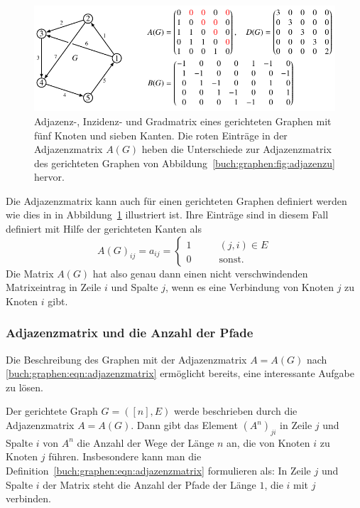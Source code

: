 \begin{figure}
\centering
\includegraphics{chapters/70-graphen/images/adjazenzd.pdf}
\caption{Adjazenz-, Inzidenz- und Gradmatrix eines gerichteten
Graphen mit fünf Knoten und sieben Kanten.
Die roten Einträge in der Adjazenzmatrix $A(G)$ heben die
Unterschiede zur Adjazenzmatrix des gerichteten Graphen
von Abbildung~\ref{buch:graphen:fig:adjazenzu} hervor.
\label{buch:graphen:fig:adjazenzd}}
\end{figure}
Die Adjazenzmatrix kann auch für einen gerichteten Graphen definiert
werden wie dies in in Abbildung~\ref{buch:graphen:fig:adjazenzd}
illustriert ist.
Ihre Einträge sind in diesem Fall definiert mit Hilfe der 
gerichteten Kanten als
\begin{equation}
A(G)_{i\!j}
=
a_{i\!j}
=
\begin{cases}
1&\qquad  (j,i) \in E\\
0&\qquad  \text{sonst.}
\end{cases}
\label{buch:graphen:eqn:adjazenzmatrixgerichtet}
\end{equation}
Die Matrix $A(G)$ hat also genau dann einen nicht verschwindenden
Matrixeintrag in Zeile $i$ und Spalte $j$, wenn es eine Verbindung
von Knoten $j$ zu Knoten $i$ gibt.


\subsubsection{Adjazenzmatrix und die Anzahl der Pfade}
Die Beschreibung des Graphen mit der Adjazenzmatrix $A=A(G)$ nach
\eqref{buch:graphen:eqn:adjazenzmatrix} ermöglicht bereits, eine
interessante Aufgabe zu lösen.

\begin{satz}
\label{buch:graphen:pfade-der-laenge-n}
Der gerichtete Graph $G=([n],E)$ werde beschrieben durch die Adjazenzmatrix
$A=A(G)$.
Dann gibt das Element $(A^n)_{ji}$ in Zeile $j$ und Spalte $i$ von $A^n$
die Anzahl der Wege der Länge $n$ an, die von Knoten $i$ zu Knoten $j$ führen.
Insbesondere kann man die Definition~\eqref{buch:graphen:eqn:adjazenzmatrix}
formulieren als: In Zeile $j$ und Spalte $i$ der Matrix steht die Anzahl
der Pfade der Länge $1$, die $i$ mit $j$ verbinden.
\end{satz}
%

